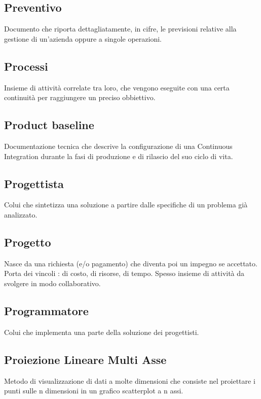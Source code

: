 \documentclass[../glossario.tex]{subfiles}
\begin{document}
\subsection*{Preventivo}
Documento che riporta dettagliatamente, in cifre, le previsioni relative alla gestione di un'azienda oppure a singole operazioni.

\subsection*{Processi} 
Insieme di attività correlate tra loro, che vengono eseguite con una certa continuità per raggiungere un preciso obbiettivo.

\subsection*{Product baseline} 
Documentazione tecnica che descrive la configurazione di una Continuous Integration durante la fasi di produzione e di rilascio del suo ciclo di vita.

\subsection*{Progettista} 
Colui che sintetizza una soluzione a partire dalle specifiche di un problema già analizzato.

\subsection*{Progetto} 
Nasce da una richiesta (e/o pagamento) che diventa poi un impegno se accettato. Porta dei vincoli : di costo, di risorse, di tempo. Spesso insieme di attività da svolgere in modo collaborativo.

\subsection*{Programmatore} 
Colui che implementa una parte della soluzione dei progettisti.

\subsection*{Proiezione Lineare Multi Asse}
Metodo di visualizzazione di dati a molte dimensioni che consiste nel proiettare i punti sulle n dimensioni in un grafico scatterplot a n assi. 
\end{document}
